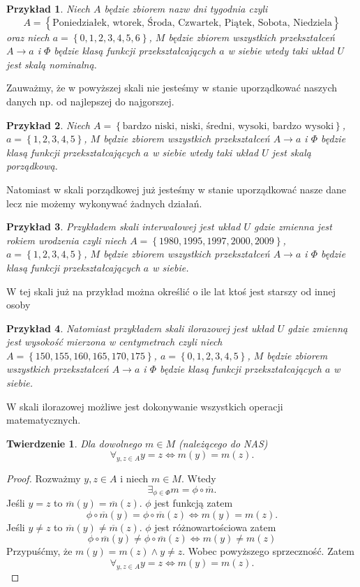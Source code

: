 \documentclass[12pt,a4paper]{report}
\newtheorem{przyklad}{Przykład}
\newtheorem{tw}[definition]{Twierdzenie}
\newcommand{\zbior}[1]{\left\lbrace {#1} \right\rbrace }
\begin{document}
\begin{przyklad}
Niech $A$ będzie zbiorem nazw dni tygodnia czyli  $$
A=\zbior{\textrm{Poniedziałek, wtorek, Środa, Czwartek, Piątek, Sobota, Niedziela}}
$$
oraz niech $a=\zbior{0,1,2,3,4,5,6}$, $M$ będzie zbiorem wszystkich przekształceń $A \to a$ i $\Phi$ będzie klasą funkcji przekształcających $a$ w siebie wtedy taki układ $U$ jest skalą nominalną.
\end{przyklad}
Zauważmy, że w powyższej skali nie jesteśmy w stanie uporządkować naszych danych np. od najlepszej do najgorszej. 
\begin{przyklad}
Niech $A=\zbior{\textrm{bardzo niski, niski, średni, wysoki, bardzo wysoki}}$, $a=\zbior{1,2,3,4,5}$, $M$ będzie zbiorem wszystkich przekształceń $A \to a$ i $\Phi$ będzie klasą funkcji przekształcających $a$ w siebie wtedy taki układ $U$ jest skalą porządkową.
\end{przyklad}
Natomiast w skali porządkowej już jesteśmy w stanie uporządkować nasze dane lecz nie możemy wykonywać żadnych działań.
\begin{przyklad}
Przykładem skali interwałowej jest układ $U$ gdzie zmienna jest rokiem urodzenia czyli niech $A=\zbior{1980,1995,1997,2000,2009}$, $a=\zbior{1,2,3,4,5}$, $M$ będzie zbiorem wszystkich przekształceń $A \to a$ i $\Phi$ będzie klasą funkcji przekształcających $a$ w siebie.
\end{przyklad}
W tej skali już na przykład można określić o ile lat ktoś jest starszy od innej osoby 
\begin{przyklad}
Natomiast przykładem skali ilorazowej jest układ $U$ gdzie zmienną jest wysokość mierzona w centymetrach czyli niech $A=\zbior{150,155,160,165,170,175}$, $a=\zbior{0,1,2,3,4,5}$, $M$ będzie zbiorem wszystkich przekształceń $A \to a$ i $\Phi$ będzie klasą funkcji przekształcających $a$ w siebie.
\end{przyklad}
W skali ilorazowej możliwe jest dokonywanie wszystkich operacji matematycznych.
\begin{tw}
Dla dowolnego $m\in M$ (należącego do NAS) $$
\forall_{y,z \in A} y=z \iff m(y)=m(z).
$$
\end{tw}
\begin{proof}
Rozważmy $y,z \in A$ i niech $m \in M$. Wtedy
\begin{equation*}
\exists_{\phi \in \Phi} m=\phi \circ \overline{m}.
\end{equation*}
Jeśli $y=z$ to $\overline{m}(y)=\overline{m}(z)$. $\phi$ jest funkcją zatem 
\begin{equation*}
\phi \circ \overline{m}(y)=\phi \circ \overline{m}(z) \iff m(y)=m(z).
\end{equation*}
Jeśli $y\ne z$ to $\overline{m}(y)\ne \overline{m}(z)$. $\phi$ jest różnowartościowa zatem
\begin{equation*}
\phi \circ \overline{m}(y) \ne \phi \circ \overline{m}(z) \iff m(y) \ne m(z)
\end{equation*}
Przypuśćmy, że $m(y)=m(z) \land y \ne z$. Wobec powyższego sprzeczność. Zatem
\begin{equation*}
\forall_{y,z \in A} y=z \iff m(y)=m(z).
\end{equation*}
\end{proof}
\end{document}
